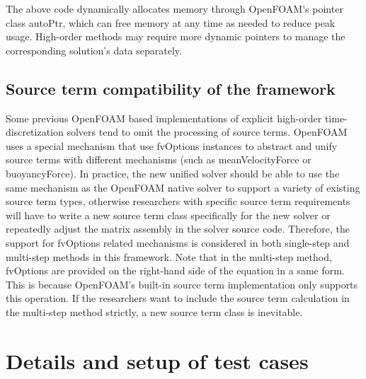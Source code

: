 \documentclass{article}
\begin{document}
The above code dynamically allocates memory through OpenFOAM's pointer class autoPtr, which can free memory at any time as needed to reduce peak usage. High-order methods may require more dynamic pointers to manage the corresponding solution's data separately.


\subsection{Source term compatibility of the framework}

Some previous OpenFOAM based implementations of explicit high-order time-discretization solvers tend to omit the processing of source terms. OpenFOAM uses a special mechanism that use fvOptions instances to abstract and unify source terms with different mechanisms (such as meanVelocityForce or buoyancyForce). In practice, the new unified solver should be able to use the same mechanism as the OpenFOAM native solver to support a variety of existing source term types, otherwise researchers with specific source term requirements will have to write a new source term class specifically for the new solver or repeatedly adjust the matrix assembly in the solver source code. Therefore, the support for fvOptions related mechanisms is considered in both single-step and multi-step methods in this framework. Note that in the multi-step method, fvOptions are provided on the right-hand side of the equation in a same form. This is because OpenFOAM's built-in source term implementation only supports this operation. If the researchers want to include the source term calculation in the multi-step method strictly, a new source term class is inevitable.


\section{Details and setup of test cases}
\label{sec:setup}
\end{document}
